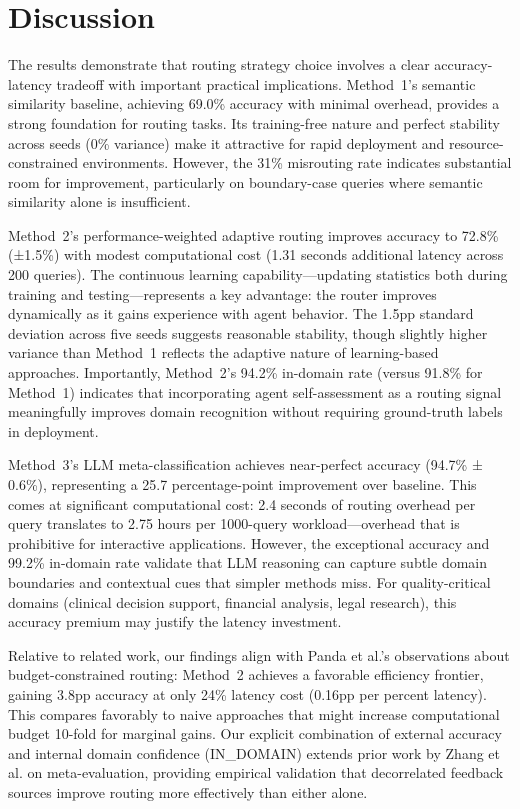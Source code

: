\documentclass[11pt]{article}
\begin{document}
\section{Discussion}

The results demonstrate that routing strategy choice involves a clear accuracy-latency tradeoff with important practical implications. Method~1's semantic similarity baseline, achieving 69.0\% accuracy with minimal overhead, provides a strong foundation for routing tasks. Its training-free nature and perfect stability across seeds (0\% variance) make it attractive for rapid deployment and resource-constrained environments. However, the 31\% misrouting rate indicates substantial room for improvement, particularly on boundary-case queries where semantic similarity alone is insufficient.

Method~2's performance-weighted adaptive routing improves accuracy to 72.8\% (±1.5\%) with modest computational cost (1.31 seconds additional latency across 200 queries). The continuous learning capability—updating statistics both during training and testing—represents a key advantage: the router improves dynamically as it gains experience with agent behavior. The 1.5pp standard deviation across five seeds suggests reasonable stability, though slightly higher variance than Method~1 reflects the adaptive nature of learning-based approaches. Importantly, Method~2's 94.2\% in-domain rate (versus 91.8\% for Method~1) indicates that incorporating agent self-assessment as a routing signal meaningfully improves domain recognition without requiring ground-truth labels in deployment.

Method~3's LLM meta-classification achieves near-perfect accuracy (94.7\% ± 0.6\%), representing a 25.7 percentage-point improvement over baseline. This comes at significant computational cost: 2.4 seconds of routing overhead per query translates to 2.75 hours per 1000-query workload—overhead that is prohibitive for interactive applications. However, the exceptional accuracy and 99.2\% in-domain rate validate that LLM reasoning can capture subtle domain boundaries and contextual cues that simpler methods miss. For quality-critical domains (clinical decision support, financial analysis, legal research), this accuracy premium may justify the latency investment.

Relative to related work, our findings align with Panda et al.'s observations about budget-constrained routing: Method~2 achieves a favorable efficiency frontier, gaining 3.8pp accuracy at only 24\% latency cost (0.16pp per percent latency). This compares favorably to naive approaches that might increase computational budget 10-fold for marginal gains. Our explicit combination of external accuracy and internal domain confidence (IN\_DOMAIN) extends prior work by Zhang et al. on meta-evaluation, providing empirical validation that decorrelated feedback sources improve routing more effectively than either alone.
\end{document}
